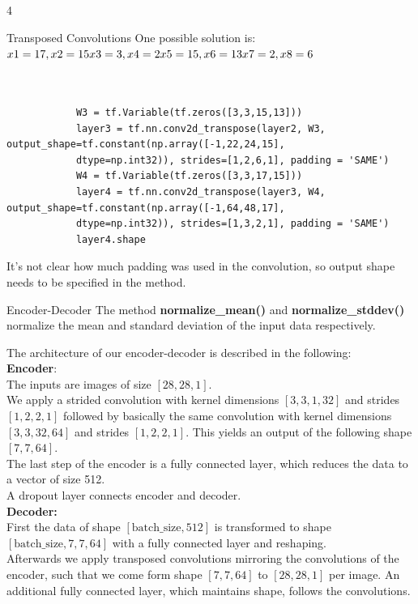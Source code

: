 \documentclass{article}
\begin{document}
    \begin{ukon-infie}[28.1.18]{4}

		
		\begin{exercise}[p=20]{Transposed Convolutions}
		\question{}
		{
			One possible solution is:\\
			$x1=17, x2=15\\ x3=3, x4=2\\ x5=15, x6=13\\ x7=2, x8=6$
		}
		\question{}{}
		\begin{verbatim}
		
		
			W3 = tf.Variable(tf.zeros([3,3,15,13]))
			layer3 = tf.nn.conv2d_transpose(layer2, W3, output_shape=tf.constant(np.array([-1,22,24,15],
			dtype=np.int32)), strides=[1,2,6,1], padding = 'SAME')
			W4 = tf.Variable(tf.zeros([3,3,17,15]))
			layer4 = tf.nn.conv2d_transpose(layer3, W4, output_shape=tf.constant(np.array([-1,64,48,17],
			dtype=np.int32)), strides=[1,3,2,1], padding = 'SAME')
			layer4.shape
		\end{verbatim}	
		
		\question{}
		{
			It's not clear how much padding was used in the convolution, so output shape needs to be specified in the method.
		}
		\end{exercise}
		
		\begin{exercise}[p=60]{Encoder-Decoder}
		\question{}
		{
		The method \textbf{normalize\_mean()} and \textbf{normalize\_stddev()} normalize the mean and standard deviation of the input data respectively.
		}
		\question{}
		{		
		The architecture of our encoder-decoder is described in the following:\\
		\textbf{Encoder}:\\
		The inputs are images of size $[28 , 28 , 1]$.\\
		We apply a strided convolution with kernel dimensions $[3,3,1,32]$ and strides $[1,2,2,1]$ followed by basically the same convolution with kernel dimensions $[3,3,32,64]$ and strides $[1,2,2,1]$. This yields an output of the following shape $[7,7,64]$.\\
		The last step of the encoder is a fully connected layer, which reduces the data to a vector of size 512.\\
		A dropout layer connects encoder and decoder.\\
		
		\textbf{Decoder:}\\
		First the data of shape $[\text{batch\_size},512 ]$ is transformed to shape $[\text{batch\_size},7,7,64 ]$ with a fully connected layer and reshaping.\\
		Afterwards we apply transposed convolutions mirroring the convolutions of the encoder, such that we come form shape $[7,7,64]$ to $[28,28,1]$ per image. An additional fully connected layer, which maintains shape, follows the convolutions.
		
}
\end{exercise}
\end{ukon-infie}
\end{document}
